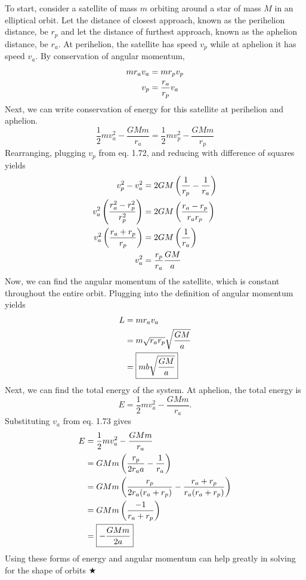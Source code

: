 \noindent To start, consider a satellite of mass $m$ orbiting around a star of mass $M$ in an elliptical orbit. Let the distance of closest approach, known as the perihelion distance, be $r_p$ and let the distance of furthest approach, known as the aphelion distance, be $r_a$. At perihelion, the satellite has speed $v_p$ while at aphelion it has speed $v_a$. By conservation of angular momentum,
\begin{align}
    mr_av_a &= mr_pv_p \nonumber \\
    v_p &= \frac{r_a}{r_p}v_a
\end{align}
\noindent Next, we can write conservation of energy for this satellite at perihelion and aphelion.
\begin{equation*}
    \frac12 mv_a^2 -\frac{GMm}{r_a} = \frac12mv_p^2 - \frac{GMm}{r_p}
\end{equation*}
\noindent Rearranging, plugging $v_p$ from eq. 1.72, and reducing with difference of squares yields
\begin{align}
    v_p^2 - v_a^2 &= 2GM\left(\frac{1}{r_p} - \frac{1}{r_a}\right) \nonumber \\
    v_a^2\left(\frac{r_a^2 -r_p^2}{r_p^2}\right) &= 2GM\left(\frac{r_a-r_p}{r_ar_p}\right) \nonumber \\
    v_a^2\left(\frac{r_a +r_p}{r_p}\right) &= 2GM\left(\frac{1}{r_a}\right) \nonumber \\
    v_a^2 &= \frac{r_p}{r_a} \frac{GM}{a}
\end{align}
\noindent Now, we can find the angular momentum of the satellite, which is constant throughout the entire orbit. Plugging into the definition of angular momentum yields
\begin{align}
    L &= mr_av_a \nonumber \\
    &= m\sqrt{r_ar_p}\sqrt{\frac{GM}{a}} \nonumber \\
    &= \boxed{mb\sqrt{\frac{GM}{a}}}
\end{align}
\noindent Next, we can find the total energy of the system. At aphelion, the total energy is 
\begin{equation*}
    E = \frac12 mv_a^2 -\frac{GMm}{r_a}.
\end{equation*}
\noindent Substituting $v_a$ from eq. 1.73 gives
\begin{align}
    E &= \frac12 mv_a^2 -\frac{GMm}{r_a} \nonumber \\
    &= GMm\left(\frac{r_p}{2r_aa} - \frac{1}{r_a}\right) \nonumber \\
    &= GMm\left(\frac{r_p}{2r_a(r_a + r_p)} - \frac{r_a+r_p}{r_a(r_a+r_p)}\right) \nonumber \\
    &= GMm\left(\frac{-1}{r_a+r_p}\right) \nonumber \\
    &= \boxed{-\frac{GMm}{2a}}
\end{align}
\noindent Using these forms of energy and angular momentum can help greatly in solving for the shape of orbits $\bigstar$

%
%
